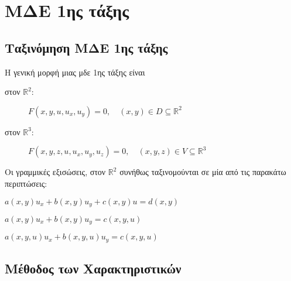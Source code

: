 



\geometry{top=1cm}

\pagestyle{vangelis}
\everymath{\displaystyle}
\setcounter{chapter}{1}



\chapter*{ΜΔΕ 1ης τάξης}

\section*{Ταξινόμηση ΜΔΕ 1ης τάξης}

Η γενική μορφή μιας μδε 1ης τάξης είναι 
\begin{description}
  \item [στον $\mathbb{R}^{2}$:] $ F(x,y,u,u_{x},u_{y}) = 0, \quad (x,y) \in D 
    \subseteq \mathbb{R}^{2} $  
  \item [στον $\mathbb{R}^{3}:$] $ F(x,y,z,u,u_{x},u_{y},u_{z}) = 0, \quad (x,y,z) \in V 
    \subseteq \mathbb{R}^{3} $ 
\end{description} 

Οι γραμμικές εξισώσεις, στον $ \mathbb{R}^{2} $ συνήθως ταξινομούνται σε μία από τις 
παρακάτω περιπτώσεις:
\begin{description}
  [widest=Σχεδον Γραμμικες:,labelindent=1em,labelsep*=1em, itemindent=0pt,leftmargin=*]
\item [Γραμμικές:] $ a(x,y)u_{x}+b(x,y)u_{y}+c(x,y)u=d(x,y) $
\item [Σχεδόν Γραμμικές:] $ a(x,y)u_{x}+b(x,y)u_{y}=c(x,y,u) $
\item [Ημιγραμμικές:] $ a(x,y,u)u_{x}+b(x,y,u)u_{y}=c(x,y,u) $
\end{description}

\section*{Μέθοδος των Χαρακτηριστικών}

